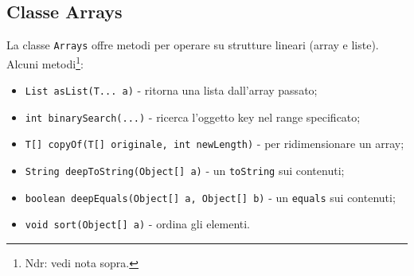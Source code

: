 \subsection{Classe Arrays}
La classe \texttt{Arrays} offre metodi per operare su strutture lineari (array e liste). Alcuni metodi\footnote{Ndr: vedi nota sopra.}:
\begin{itemize}
\item \texttt{List asList(T... a)} - ritorna una lista dall'array passato;
\item \texttt{int binarySearch(...)} - ricerca l'oggetto key nel range specificato; 
\item \texttt{T[] copyOf(T[] originale, int newLength)} - per ridimensionare un array;
\item \texttt{String deepToString(Object[] a)} - un \texttt{toString} sui contenuti; 
\item \texttt{boolean deepEquals(Object[] a, Object[] b)} - un \texttt{equals} sui contenuti; 
\item \texttt{void sort(Object[] a)} - ordina gli elementi. 
\end{itemize}
